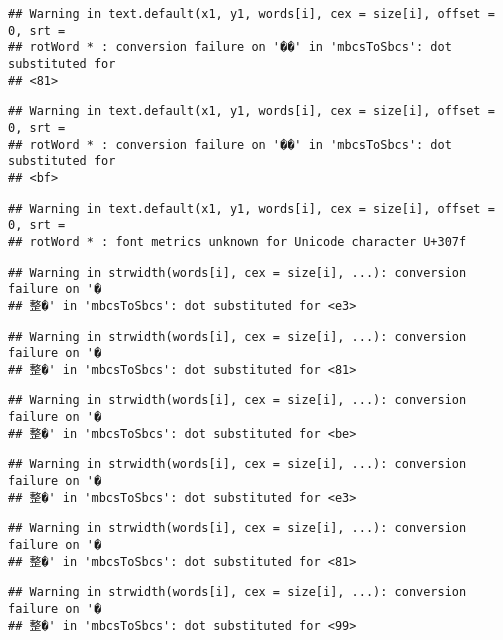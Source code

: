 \documentclass[]{article}
\begin{document}
\begin{verbatim}
## Warning in text.default(x1, y1, words[i], cex = size[i], offset = 0, srt =
## rotWord * : conversion failure on '��' in 'mbcsToSbcs': dot substituted for
## <81>
\end{verbatim}

\begin{verbatim}
## Warning in text.default(x1, y1, words[i], cex = size[i], offset = 0, srt =
## rotWord * : conversion failure on '��' in 'mbcsToSbcs': dot substituted for
## <bf>
\end{verbatim}

\begin{verbatim}
## Warning in text.default(x1, y1, words[i], cex = size[i], offset = 0, srt =
## rotWord * : font metrics unknown for Unicode character U+307f
\end{verbatim}

\begin{verbatim}
## Warning in strwidth(words[i], cex = size[i], ...): conversion failure on '�
## 整�' in 'mbcsToSbcs': dot substituted for <e3>
\end{verbatim}

\begin{verbatim}
## Warning in strwidth(words[i], cex = size[i], ...): conversion failure on '�
## 整�' in 'mbcsToSbcs': dot substituted for <81>
\end{verbatim}

\begin{verbatim}
## Warning in strwidth(words[i], cex = size[i], ...): conversion failure on '�
## 整�' in 'mbcsToSbcs': dot substituted for <be>
\end{verbatim}

\begin{verbatim}
## Warning in strwidth(words[i], cex = size[i], ...): conversion failure on '�
## 整�' in 'mbcsToSbcs': dot substituted for <e3>
\end{verbatim}

\begin{verbatim}
## Warning in strwidth(words[i], cex = size[i], ...): conversion failure on '�
## 整�' in 'mbcsToSbcs': dot substituted for <81>
\end{verbatim}

\begin{verbatim}
## Warning in strwidth(words[i], cex = size[i], ...): conversion failure on '�
## 整�' in 'mbcsToSbcs': dot substituted for <99>
\end{verbatim}
\end{document}
